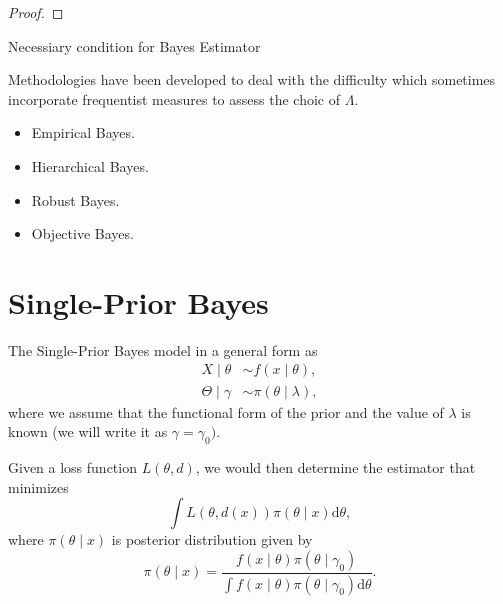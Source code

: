 \begin{proof}

\end{proof}

\begin{theorem}{}{}
    Necessiary condition for Bayes Estimator
\end{theorem}

Methodologies have been developed to deal with the difficulty which sometimes incorporate frequentist measures to assess the choic of $\Lambda$.

\begin{itemize}
    \item Empirical Bayes.
    \item Hierarchical Bayes.
    \item Robust Bayes.
    \item Objective Bayes.
\end{itemize}

\section{Single-Prior Bayes}

The Single-Prior Bayes model in a general form as
\begin{equation}
    \begin{aligned}
        X\mid\theta      & \sim f\left(x\mid\theta\right),         \\
        \Theta\mid\gamma & \sim \pi\left(\theta\mid\lambda\right),
    \end{aligned}
    \label{eq:single-prior-bayes}
\end{equation}
where we assume that the functional form of the prior and the value of $\lambda$ is known (we will write it as $\gamma=\gamma_0)$.

Given a loss function $L\left(\theta,d\right)$, we would then determine the estimator that minimizes
\begin{equation}
    \int L\left(\theta,d\left(x\right)\right)\pi\left(\theta\mid x\right)\mathrm{d}\theta,
\end{equation}
where $\pi\left(\theta\mid x\right)$ is posterior distribution given by
\begin{equation*}
    \pi\left(\theta\mid x\right)=\frac{f\left(x\mid\theta\right)\pi\left(\theta\mid\gamma_0\right)}{\int f\left(x\mid\theta\right)\pi\left(\theta\mid\gamma_0\right)\mathrm{d}\theta}.
\end{equation*}

